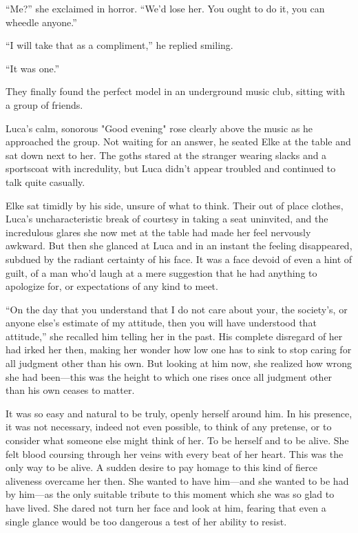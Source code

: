 ``Me?'' she exclaimed in horror. ``We'd lose her. You ought to do it, you can wheedle anyone.''

``I will take that as a compliment,'' he replied smiling.

``It was one.''

They finally found the perfect model in an underground music club, sitting with a group of friends.

Luca's calm, sonorous "Good evening" rose clearly above the music as he approached the group. Not waiting for an answer, he seated Elke at the table and sat down next to her. The goths stared at the stranger wearing slacks and a sportscoat with incredulity, but Luca didn't appear troubled and continued to talk quite casually.

Elke sat timidly by his side, unsure of what to think. Their out of place clothes, Luca's uncharacteristic break of courtesy in taking a seat uninvited, and the incredulous glares she now met at the table had made her feel nervously awkward. But then she glanced at Luca and in an instant the feeling disappeared, subdued by the radiant certainty of his face. It was a face devoid of even a hint of guilt, of a man who'd laugh at a mere suggestion that he had anything to apologize for, or expectations of any kind to meet.

``On the day that you understand that I do not care about your, the society's, or anyone else's estimate of my attitude, then you will have understood that attitude,'' she recalled him telling her in the past. His complete disregard of her had irked her then, making her wonder how low one has to sink to stop caring for all judgment other than his own. But looking at him now, she realized how wrong she had been---this was the height to which one rises once all judgment other than his own ceases to matter.

It was so easy and natural to be truly, openly herself around him. In his presence, it was not necessary, indeed not even possible, to think of any pretense, or to consider what someone else might think of her. To be herself and to be alive. She felt blood coursing through her veins with every beat of her heart. This was the only way to be alive. A sudden desire to pay homage to this kind of fierce aliveness overcame her then. She wanted to have him---and she wanted to be had by him---as the only suitable tribute to this moment which she was so glad to have lived. She dared not turn her face and look at him, fearing that even a single glance would be too dangerous a test of her ability to resist.

